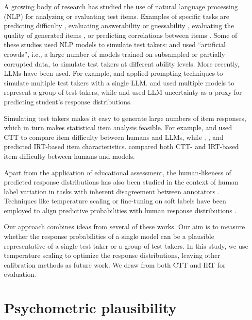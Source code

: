 \documentclass[11pt]{article}
\begin{document}
A growing body of research has studied the use of natural language processing (NLP) for analyzing or evaluating test items. Examples of specific tasks are predicting difficulty \citep{Yaneva2024}, evaluating answerability or guessability \citep{Raina2023,Saeuberli2024}, evaluating the quality of generated items \citep{Raina2022,Gorgun2024}, or predicting correlations between items \citep{Hernandez2022}. Some of these studies used NLP models to simulate test takers: \citet{Lalor2019} and \citet{Byrd2022} used ``artificial crowds'', i.e., a large number of models trained on subsampled or partially corrupted data, to simulate test takers at different ability levels. More recently, LLMs have been used. For example, \citet{Lu2024} and \citet{Hayakawa2024} applied prompting techniques to simulate multiple test takers with a single LLM. \citet{Park2024} and \citet{LaverghettaJr2022} used multiple models to represent a group of test takers, while \citet{Liusie2023} and \citet{Zotos2025} used LLM uncertainty as a proxy for predicting student's response distributions.

Simulating test takers makes it easy to generate large numbers of item responses, which in turn makes statistical item analysis feasible. For example, \citet{Liusie2023} and \citet{Hayakawa2024} used CTT to compare item difficulty between humans and LLMs, while \citet{Lalor2019}, \citet{Byrd2022}, and \citet{Park2024} predicted IRT-based item characteristics. \citet{LaverghettaJr2022} compared both CTT- and IRT-based item difficulty between humans and models.

Apart from the application of educational assessment, the human-likeness of predicted response distributions has also been studied in the context of human label variation in tasks with inherent disagreement between annotators \citep{Plank2022}. Techniques like temperature scaling or fine-tuning on soft labels have been employed to align predictive probabilities with human response distributions \citep{Baan2022,Chen2024}.

Our approach combines ideas from several of these works. Our aim is to measure whether the response probabilities of a single model can be a plausible representative of a single test taker or a group of test takers. In this study, we use temperature scaling to optimize the response distributions, leaving other calibration methods as future work. We draw from both CTT and IRT for evaluation.


\section{Psychometric plausibility}
\label{sec:method}
\end{document}
